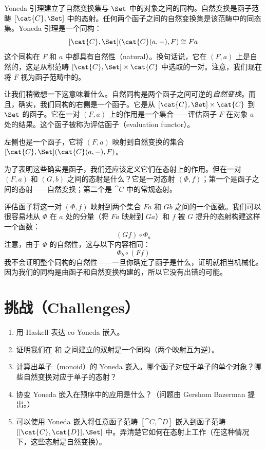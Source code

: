 Yoneda 引理建立了自然变换集与 $\Set$ 中的对象之间的同构。自然变换是函子范畴 $[\cat{C}, \Set]$ 中的态射。任何两个函子之间的自然变换集是该范畴中的同态集。Yoneda 引理是一个同构：
\[[\cat{C}, \Set](\cat{C}(a, -), F) \cong F a\]
这个同构在 $F$ 和 $a$ 中都具有自然性（natural）。换句话说，它在 $(F, a)$ 上是自然的，这是从积范畴 $[\cat{C}, \Set] \times \cat{C}$ 中选取的一对。注意，我们现在将 $F$ 视为函子范畴中的。

让我们稍微想一下这意味着什么。自然同构是两个函子之间可逆的\emph{自然变换}。而且，确实，我们同构的右侧是一个函子。它是从 $[\cat{C}, \Set] \times \cat{C}$ 到 $\Set$ 的函子。它在一对 $(F, a)$ 上的作用是一个集合——评估函子 $F$ 在对象 $a$ 处的结果。这个函子被称为评估函子（evaluation functor）。

左侧也是一个函子，它将 $(F, a)$ 映射到自然变换的集合 $[\cat{C}, \Set](\cat{C}(a, -), F)$。

为了表明这些确实是函子，我们还应该定义它们在态射上的作用。但在一对 $(F, a)$ 和 $(G, b)$ 之间的态射是什么？它是一对态射 $(\Phi, f)$；第一个是函子之间的态射——自然变换；第二个是 $\cat{C}$ 中的常规态射。

评估函子将这一对 $(\Phi, f)$ 映射到两个集合 $F a$ 和 $G b$ 之间的一个函数。我们可以很容易地从 $\Phi$ 在 $a$ 处的分量（将 $F a$ 映射到 $G a$）和 $f$ 被 $G$ 提升的态射构建这样一个函数：
\[(G f) \circ \Phi_a\]
注意，由于 $\Phi$ 的自然性，这与以下内容相同：
\[\Phi_b \circ (F f)\]
我不会证明整个同构的自然性——一旦你确定了函子是什么，证明就相当机械化。因为我们的同构是由函子和自然变换构建的，所以它没有出错的可能。

\section{挑战（Challenges）}

\begin{enumerate}
  \tightlist
  \item
  用 Haskell 表达 co-Yoneda 嵌入。
  \item
  证明我们在  和  之间建立的双射是一个同构（两个映射互为逆）。
  \item
  计算出单子（monoid）的 Yoneda 嵌入。哪个函子对应于单子的单个对象？哪些自然变换对应于单子的态射？
  \item
  协变 Yoneda 嵌入在预序中的应用是什么？（问题由 Gershom Bazerman 提出。）
  \item
  可以使用 Yoneda 嵌入将任意函子范畴 $[\cat{C}, \cat{D}]$ 嵌入到函子范畴 $[[\cat{C}, \cat{D}], \Set]$ 中。弄清楚它如何在态射上工作（在这种情况下，这些态射是自然变换）。
\end{enumerate}
